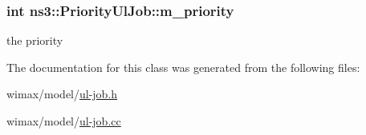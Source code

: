\subsubsection[{\texorpdfstring{m\+\_\+priority}{m_priority}}]{\setlength{\rightskip}{0pt plus 5cm}int ns3\+::\+Priority\+Ul\+Job\+::m\+\_\+priority\hspace{0.3cm}{\ttfamily [private]}}\hypertarget{classns3_1_1PriorityUlJob_ad8ba9e3d6956f3576b372b9fc447b801}{}\label{classns3_1_1PriorityUlJob_ad8ba9e3d6956f3576b372b9fc447b801}


the priority 



The documentation for this class was generated from the following files\+:\begin{DoxyCompactItemize}
\item 
wimax/model/\hyperlink{ul-job_8h}{ul-\/job.\+h}\item 
wimax/model/\hyperlink{ul-job_8cc}{ul-\/job.\+cc}\end{DoxyCompactItemize}
